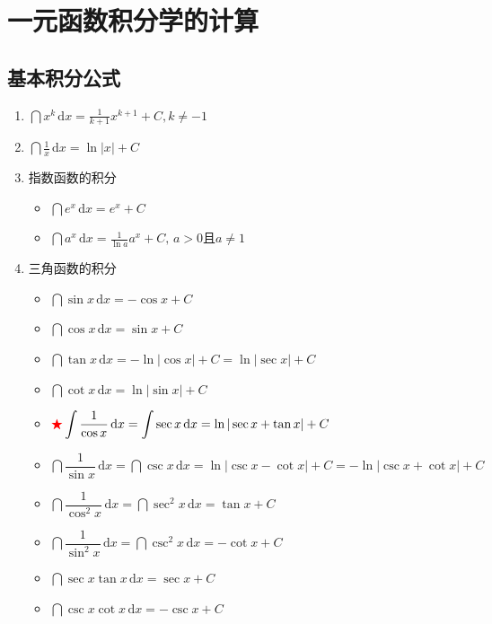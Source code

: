 \documentclass[../book.tex]{subfiles}
\begin{document}
    \section{一元函数积分学的计算}

    \subsection{基本积分公式}

    \begin{enumerate}
        \item $\dint x^k\,\mathrm{d}x = \displaystyle\frac{1}{k+1}x^{k+1} + C, k \neq -1$
        \item $\dint \displaystyle\frac{1}{x}\,\mathrm{d}x = \ln |x| + C$
        \item 指数函数的积分
        \begin{itemize}
            \item $\dint e^x\,\mathrm{d}x = e^x + C$
            \item $\dint a^x\,\mathrm{d}x = \displaystyle\frac{1}{\ln a}a^x + C, \,a > 0 \text{且} a \neq 1$
        \end{itemize}
        \item 三角函数的积分
        \begin{itemize}
            \item $\dint \sin x\,\mathrm{d}x = -\cos x + C$
            \item $\dint \cos x\,\mathrm{d}x = \sin x + C$
            \item $\dint \tan x\,\mathrm{d}x = -\ln |\cos x| + C = \ln |\sec x| + C$
            \item $\dint \cot x\,\mathrm{d}x = \ln |\sin x| + C$
            \item ${\color{red}{\bigstar}}\displaystyle\int \dfrac{1}{\cos x}\,\mathrm{d}x = \displaystyle\int \sec x\,\mathrm{d}x = \ln |\sec x + \tan x| + C$
            \item $\dint \dfrac{1}{\sin x}\,\mathrm{d}x = \dint \csc x\,\mathrm{d}x = \ln |\csc x - \cot x| + C = -\ln |\csc x + \cot x| + C$
            \item $\dint \dfrac{1}{\cos^2 x}\,\mathrm{d}x = \dint \sec^2 x\,\mathrm{d}x = \tan x + C$
            \item $\dint \dfrac{1}{\sin^2 x}\,\mathrm{d}x = \dint \csc^2 x\,\mathrm{d}x = -\cot x + C$
            \item $\dint \sec x \tan x\,\mathrm{d}x = \sec x + C$
            \item $\dint \csc x \cot x\,\mathrm{d}x = -\csc x + C$

\end{itemize}
\end{enumerate}
\end{document}
